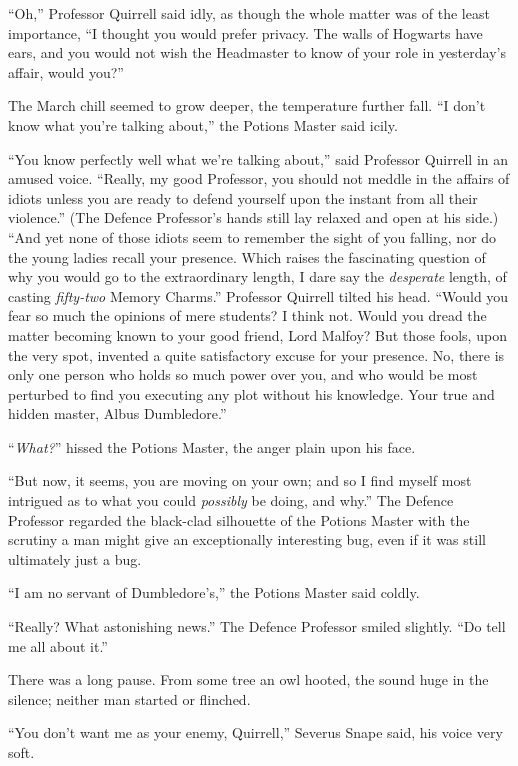 “Oh,” Professor Quirrell said idly, as though the whole matter was of the least importance, “I thought you would prefer privacy. The walls of Hogwarts have ears, and you would not wish the Headmaster to know of your role in yesterday’s affair, would you?”

The March chill seemed to grow deeper, the temperature further fall. “I don’t know what you’re talking about,” the Potions Master said icily.

“You know perfectly well what we’re talking about,” said Professor Quirrell in an amused voice. “Really, my good Professor, you should not meddle in the affairs of idiots unless you are ready to defend yourself upon the instant from all their violence.” (The Defence Professor’s hands still lay relaxed and open at his side.) “And yet none of those idiots seem to remember the sight of you falling, nor do the young ladies recall your presence. Which raises the fascinating question of why you would go to the extraordinary length, I dare say the \emph{desperate} length, of casting \emph{fifty-two} Memory Charms.” Professor Quirrell tilted his head. “Would you fear so much the opinions of mere students? I think not. Would you dread the matter becoming known to your good friend, Lord Malfoy? But those fools, upon the very spot, invented a quite satisfactory excuse for your presence. No, there is only one person who holds so much power over you, and who would be most perturbed to find you executing any plot without his knowledge. Your true and hidden master, Albus Dumbledore.”

“\emph{What?}” hissed the Potions Master, the anger plain upon his face.

“But now, it seems, you are moving on your own; and so I find myself most intrigued as to what you could \emph{possibly} be doing, and why.” The Defence Professor regarded the black-clad silhouette of the Potions Master with the scrutiny a man might give an exceptionally interesting bug, even if it was still ultimately just a bug.

“I am no servant of Dumbledore’s,” the Potions Master said coldly.

“Really? What astonishing news.” The Defence Professor smiled slightly. “Do tell me all about it.”

There was a long pause. From some tree an owl hooted, the sound huge in the silence; neither man started or flinched.

“You don’t want me as your enemy, Quirrell,” Severus Snape said, his voice very soft.

